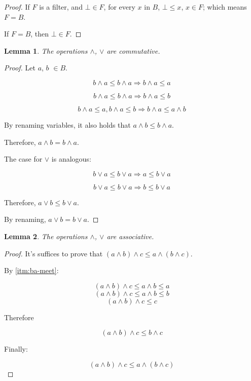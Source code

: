 \documentclass[notitlepage,a4paper]{article}
\newtheorem{lemma}{Lemma}
\begin{document}
\begin{enumerate}
     \begin{proof}
           If $F$ is a filter, and $⊥ ∈ F$, for every $x$ in $B$, $⊥ ≤ x$,
           $x ∈ F$; which means $F = B$.

           If $F = B$, then $⊥ \in F$.
     \end{proof}

      \begin{lemma}\label{lem:commutative}
       The operations $∧$, $∨$ are commutative.
     \end{lemma}

     \begin{proof}
       Let $a$, $b$ $∈ B$.
       
       $$b ∧ a ≤ b ∧ a \Rightarrow b ∧ a ≤ a$$

       $$b ∧ a ≤ b ∧ a \Rightarrow b ∧ a ≤ b$$
       
       $$b ∧ a ≤ a, b ∧ a ≤ b \Rightarrow b ∧ a ≤ a ∧ b$$

       By renaming variables,  it also holds that $a ∧ b ≤ b ∧ a$.

       Therefore, $a ∧ b = b ∧ a$.

       The case for $∨$ is analogous:

       $$b ∨ a ≤ b ∨ a \Rightarrow a ≤ b ∨ a$$
       
       $$b ∨ a ≤ b ∨ a \Rightarrow b ≤ b ∨ a$$

       Therefore, $a ∨ b ≤ b ∨ a$.

       By renaming, $a ∨ b = b ∨ a$.
       
     \end{proof}
       

     \begin{lemma}\label{lem:associative}
       The operations $∧$, $∨$ are associative.
     \end{lemma}

     \begin{proof}

       It's suffices to prove that $(a ∧ b) ∧ c ≤ a ∧ (b ∧ c)$.

       By \ref{itm:ba-meet}:

       $$(a ∧ b) ∧ c ≤ a ∧ b ≤ a$$ %
       $$(a ∧ b) ∧ c ≤ a ∧ b ≤ b$$ %
       $$(a ∧ b) ∧ c ≤ c$$         %

       Therefore

       $$(a ∧ b) ∧ c ≤ b ∧ c$$

       Finally:

       $$(a ∧ b) ∧ c ≤ a ∧ (b ∧ c)$$


\end{proof}
\end{enumerate}
\end{document}
